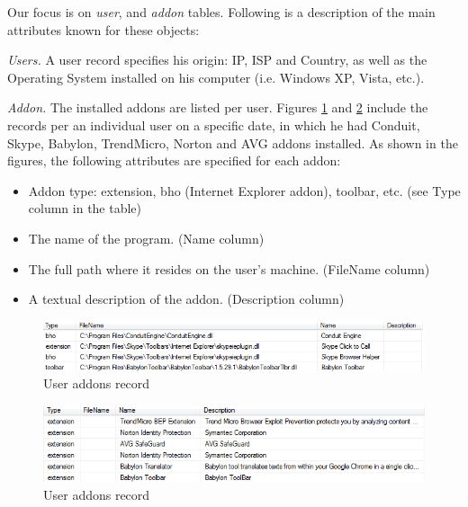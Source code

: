 \documentclass[11pt,oneside]{book}
\begin{document}
Our focus is on {\it user}, and {\it addon} tables. Following is a description of the main attributes known for these objects:

{\it Users.} A user record specifies his origin: IP, ISP and Country, as well as the Operating System installed on his computer (i.e. Windows XP, Vista, etc.).

{\it Addon.} The installed addons are listed per user. Figures \ref{fig:db_addons_snapshot} and \ref{fig:db_addons_snapshot_desc} include the records per an individual user on a specific date, in which he had Conduit, Skype, Babylon, TrendMicro, Norton and AVG addons installed. As shown in the figures, the following attributes are specified for each addon:
\begin{itemize}
\item Addon type: extension, bho (Internet Explorer addon), toolbar, etc. (see Type column in the table)
\item The name of the program. (Name column)
\item The full path where it resides on the user's machine. (FileName column)
\item A textual description of the addon. (Description column)
\end{itemize}

\begin{figure}[t]
\centering
\begin{small}
\includegraphics[scale=.8,angle=0]{figures/db_addons_snapshot.png}
\end{small}
\caption{User addons record}
\label{fig:db_addons_snapshot}
\end{figure}

\begin{figure}[t]
\centering
\begin{small}
\includegraphics[scale=.8,angle=0]{figures/db_addons_snapshot_desc.png}
\end{small}
\caption{User addons record}
\label{fig:db_addons_snapshot_desc}
\end{figure}
\end{document}
